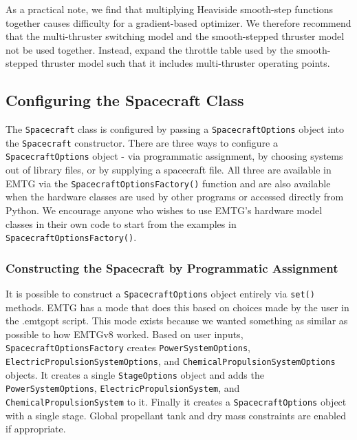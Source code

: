 As a practical note, we find that multiplying Heaviside smooth-step functions together causes difficulty for a gradient-based optimizer. We therefore recommend that the multi-thruster switching model and the smooth-stepped thruster model not be used together. Instead, expand the throttle table used by the smooth-stepped thruster model such that it includes multi-thruster operating points.

\subsection{Configuring the Spacecraft Class}
\label{subsec:configuring-the-spacecraft-class}

The \texttt{Spacecraft} class is configured by passing a \texttt{SpacecraftOptions} object into the \texttt{Spacecraft} constructor. There are three ways to configure a \texttt{SpacecraftOptions} object - via programmatic assignment, by choosing systems out of library files, or by supplying a spacecraft file. All three are available in \ac{EMTG} via the \texttt{SpacecraftOptionsFactory()} function and are also available when the hardware classes are used by other programs or accessed directly from Python. We encourage anyone who wishes to use \ac{EMTG}'s hardware model classes in their own code to start from the examples in \texttt{SpacecraftOptionsFactory()}.

\subsubsection{Constructing the Spacecraft by Programmatic Assignment}
\label{subsubsec:construct_spacecraft_programmatic}

It is possible to construct a \texttt{SpacecraftOptions} object entirely via \texttt{set()} methods. \ac{EMTG} has a mode that does this based on choices made by the user in the .emtgopt script. This mode exists because we wanted something as similar as possible to how \ac{EMTGv8} worked. Based on user inputs, \texttt{SpacecraftOptionsFactory} creates \texttt{PowerSystemOptions}, \texttt{ElectricPropulsionSystemOptions}, and \texttt{ChemicalPropulsionSystemOptions} objects. It creates a single \texttt{StageOptions} object and adds the \texttt{PowerSystemOptions}, \texttt{ElectricPropulsionSystem}, and \texttt{ChemicalPropulsionSystem} to it. Finally it creates a \texttt{SpacecraftOptions} object with a single stage. Global propellant tank and dry mass constraints are enabled if appropriate.


